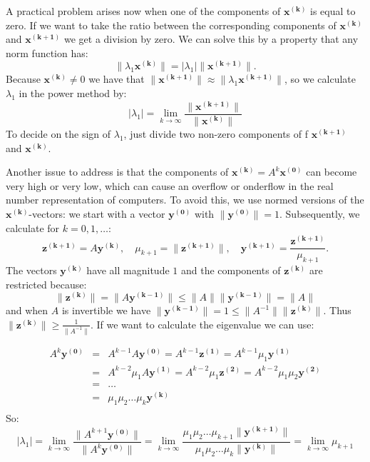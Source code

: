 \documentclass[a4paper,11pt]{report}
\begin{document}
A practical problem arises now when one of the components of $\mathbf{x^{(k)}}$ 
is equal to zero. If we want to take the ratio between the corresponding 
components of $\mathbf{x^{(k)}}$ and $\mathbf{x^{(k+1)}}$ we get a division by 
zero. We can solve this by a property that any norm function has: 
$$\|\lambda_1\mathbf{x^{(k)}}\| = |\lambda_1|\|\mathbf{x^{(k+1)}}\|.$$
Because $\mathbf{x^{(k)}} \not = 0$ we have that $\|\mathbf{x^{(k+1)}}\| \approx \|\lambda_1\mathbf{x^{(k+1)}}\|$, so we calculate
$\lambda_1$ in the power method by:
$$|\lambda_1| = \lim_{k\to\infty}\frac{\|\mathbf{x^{(k+1)}}\|}{\|\mathbf{x^{(k)}}\| }$$
To decide on the sign of $\lambda_1$, just divide two non-zero components of f $\mathbf{x^{(k+1)}}$ and 
$\mathbf{x^{(k)}}$.

Another issue to address is that the components of $\mathbf{x^{(k)}} = A^k\mathbf{x^{(0)}}$ 
can become very high or very low, which can cause an overflow or onderflow in the 
real number representation of computers. To avoid this, we use 
normed versions of the $\mathbf{x^{(k)}}$-vectors: we start with a vector $\mathbf{y^{(0)}}$ 
with $\|\mathbf{y^{(0)}}\|=1$. Subsequently, we calculate for $k = 0, 1, 
\ldots$:
$$\mathbf{z^{(k+1)}} = A\mathbf{y^{(k)}}, \quad \mu_{k+1} = \|\mathbf{z^{(k+1)}}\|, \quad \mathbf{y^{(k+1)}}=
\frac{\mathbf{z^{(k+1)}}}{\mu_{k+1}}.$$ 
The vectors $\mathbf{y^{(k)}}$ have all magnitude $1$ and the components of $\mathbf{z^{(k)}}$ 
are restricted because:
$$\|\mathbf{z^{(k)}}\| = \|A\mathbf{y^{(k-1)}}\| \leq \|A\| 
\|\mathbf{y^{(k-1)}}\| = \|A\|$$
and when $A$ is invertible we have $\|\mathbf{y^{(k-1)}}\| = 1 \leq \|A^{-1}\|\|\mathbf{z^{(k)}}\|.$ 
Thus $\|\mathbf{z^{(k)}}\| \geq \frac{1}{\|A^{-1}\|}$.
If we want to calculate the eigenvalue we can use:

\begin{eqnarray*}
  A^k\mathbf{y^{(0)}} &=& A^{k-1}A \mathbf{y^{(0)}} = A^{k-1}\mathbf{z^{(1)}} =  A^{k-1}\mu_1\mathbf{y^{(1)}}\\
  &=&  A^{k-2}\mu_1A\mathbf{y^{(1)}} = A^{k-2}\mu_1\mathbf{z^{(2)}} = 
  A^{k-2}\mu_1\mu_2\mathbf{y^{(2)}}\\
  &=& \ldots \\
  &=& \mu_1 \mu_2 \ldots \mu_k \mathbf{y^{(k)}}\\
\end{eqnarray*}
So:
$$|\lambda_1| = \lim_{k\to \infty} \frac{\|A^{k+1}\mathbf{y^{(0)}}\|}{\|A^k\mathbf{y^{(0)}}\|} 
= \lim_{k\to \infty} \frac{\mu_1\mu_2\ldots \mu_{k+1}\|\mathbf{y^{(k+1)}}\|}{\mu_1 \mu_2 \ldots \mu_k\|\mathbf{y^{(k)}}\|} 
= \lim_{k\to \infty} \mu_{k+1}$$ 
\end{document}
